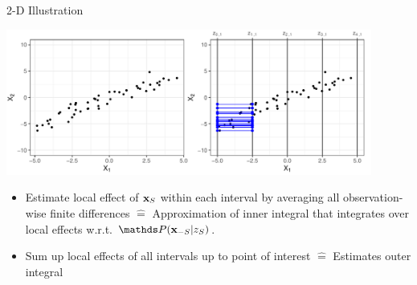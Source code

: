 \documentclass[11pt,compress,t,notes=noshow, aspectratio=169, xcolor=table]{beamer}
\begin{document}
\begin{frame}{2-D Illustration}
\centerline{\includegraphics[width=0.9\textwidth]{figure/ale_interval}}

 \begin{itemize}
  \item Estimate local effect of $\xv_S$ within each interval by averaging all observation-wise finite differences $\hat = $ Approximation of inner integral that integrates over local effects w.r.t. $\P(\xv_{-S} | z_S)$. %
  \item Sum up local effects of all intervals up to point of interest $\hat = $ Estimates outer integral
\end{itemize}

\end{frame}
%
%
%
%
%
%
%
%
%
%
\end{document}
